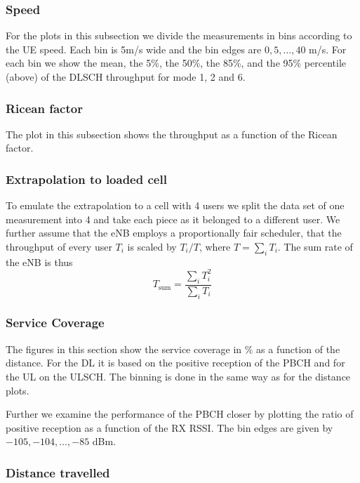 \documentclass[a4paper,10pt]{article}
\begin{document}
\subsubsection{Speed}

For the plots in this subsection we divide the measurements in bins according to the UE speed. Each bin is 5m/s wide and the bin edges are $0,5,\ldots,40$ m/s. For each bin we show the mean, the 5\%, the 50\%, the 85\%, and the 95\% percentile (above) of the DLSCH throughput for mode 1, 2 and 6. 

\subsubsection{Ricean factor}

The plot in this subsection shows the throughput as a function of the Ricean factor.

\subsubsection{Extrapolation to loaded cell}

To emulate the extrapolation to a cell with 4 users we split the data set of one measurement into 4 and take each piece as it belonged to a different user. We further assume that the eNB employs a proportionally fair scheduler, that the throughput of every user $T_i$ is scaled by $T_i/T$, where $T=\sum_i T_i$. The sum rate of the eNB is thus
\begin{equation}
 T_{\mathrm{sum}} = \frac{\sum_i T_i^2}{\sum_i T_i}
\end{equation}

\subsubsection{Service Coverage}

The figures in this section show the service coverage in \% as a function of the distance. For the DL it is based on the positive reception of the PBCH and for the UL on the ULSCH. The binning is done in the same way as for the distance plots.

Further we examine the performance of the PBCH closer by plotting the ratio of positive reception as a function of the RX RSSI. The bin edges are given by  $-105, -104, \ldots, -85$ dBm.

\subsubsection{Distance travelled}
\label{sec:dist_travelled}
\end{document}
